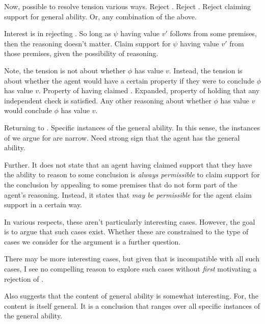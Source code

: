 \begin{note}
  Now, possible to resolve tension various ways.
  Reject \ideaCS{}.
  Reject \ESU{}.
  Reject claiming support for general ability.
  Or, any combination of the above.

  Interest is in rejecting \ESU{}.
  So long as \(\psi\) having value \(v'\) follows from some premises, then the reasoning doesn't matter.
  Claim support for \(\psi\) having value \(v'\) from those premises, given the possibility of reasoning.
\end{note}

\begin{note}
  Note, the tension is not about whether \(\phi\) has value \(v\).
  Instead, the tension is about whether the agent would have a certain property if they were to conclude \(\phi\) has value \(v\).
  Property of having claimed \support{}.
  Expanded, property of holding that any independent check is satisfied.
  Any other reasoning about whether \(\phi\) has value \(v\) would conclude \(\phi\) has value \(v\).
\end{note}

\begin{note}
  Returning to \EAS{}.
  Specific instances of the general ability.
  In this sense, the instances of \EAS{} we argue for are narrow.
  Need strong sign that the agent has the general ability.

  Further.
  It does not state that an agent having claimed support that they have the ability to reason to some conclusion is \emph{always permissible} to claim support for the conclusion by appealing to some premises that do not form part of the agent's reasoning.
  Instead, it states that \emph{may be permissible} for the agent claim support in a certain way.

  In various respects, these aren't particularly interesting cases.
  However, the goal is to argue that such cases exist.
  Whether these are constrained to the type of cases we consider for the argument is a further question.

  There may be more interesting cases, but given that \ESU{} is incompatible with all such cases, I see no compelling reason to explore such cases without \emph{first} motivating a rejection of \ESU{}.
\end{note}

\begin{note}
  Also suggests that the content of general ability is somewhat interesting.
  For, the content is itself general.
  It is a conclusion that ranges over all specific instances of the general ability.
\end{note}

